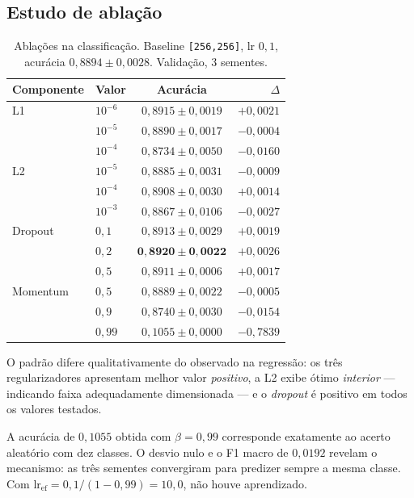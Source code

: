 \documentclass[11pt,a4paper]{article}
\begin{document}
\subsection{Estudo de ablação}

\begin{table}[htbp]
\centering
\caption{Ablações na classificação. Baseline \texttt{[256,256]}, lr $0{,}1$,
acurácia $0{,}8894 \pm 0{,}0028$. Validação, 3 sementes.}
\label{tab:clf-abl}
\begin{tabular}{llcr}
\toprule
Componente & Valor & Acurácia & $\Delta$ \\
\midrule
L1 & $10^{-6}$ & $0{,}8915 \pm 0{,}0019$ & $+0{,}0021$ \\
   & $10^{-5}$ & $0{,}8890 \pm 0{,}0017$ & $-0{,}0004$ \\
   & $10^{-4}$ & $0{,}8734 \pm 0{,}0050$ & $-0{,}0160$ \\
\midrule
L2 & $10^{-5}$ & $0{,}8885 \pm 0{,}0031$ & $-0{,}0009$ \\
   & $10^{-4}$ & $0{,}8908 \pm 0{,}0030$ & $+0{,}0014$ \\
   & $10^{-3}$ & $0{,}8867 \pm 0{,}0106$ & $-0{,}0027$ \\
\midrule
Dropout & $0{,}1$ & $0{,}8913 \pm 0{,}0029$ & $+0{,}0019$ \\
        & $0{,}2$ & $\mathbf{0{,}8920 \pm 0{,}0022}$ & $+0{,}0026$ \\
        & $0{,}5$ & $0{,}8911 \pm 0{,}0006$ & $+0{,}0017$ \\
\midrule
Momentum & $0{,}5$  & $0{,}8889 \pm 0{,}0022$ & $-0{,}0005$ \\
         & $0{,}9$  & $0{,}8740 \pm 0{,}0030$ & $-0{,}0154$ \\
         & $0{,}99$ & $0{,}1055 \pm 0{,}0000$ & $-0{,}7839$ \\
\bottomrule
\end{tabular}
\end{table}

O padrão difere qualitativamente do observado na regressão: os três regularizadores
apresentam melhor valor \emph{positivo}, a L2 exibe ótimo \emph{interior} --- indicando
faixa adequadamente dimensionada --- e o \emph{dropout} é positivo em todos os valores
testados.

A acurácia de $0{,}1055$ obtida com $\beta = 0{,}99$ corresponde exatamente ao acerto
aleatório com dez classes. O desvio nulo e o F1 macro de $0{,}0192$ revelam o mecanismo:
as três sementes convergiram para predizer sempre a mesma classe. Com
$\text{lr}_{\text{ef}} = 0{,}1/(1-0{,}99) = 10{,}0$, não houve aprendizado.
\end{document}
